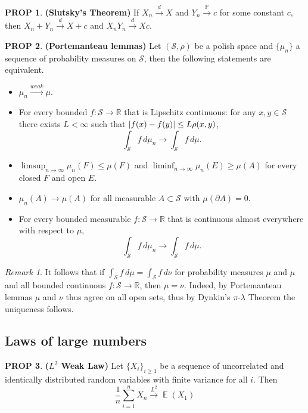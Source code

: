 \documentclass[hidelinks,11pt]{article}
\theoremstyle{definition}
\theoremstyle{dotless}
\newtheorem{prop}{PROP}[section]
\theoremstyle{remark}
\newtheorem*{remark}{Remark}
\DeclareMathOperator{\E}{\mathbb{E}}
\DeclareMathOperator{\1}{\mathbf{1}}
\begin{document}
\begin{prop}\textup{\textbf{(Slutsky's Theorem) }}If $X_n\xrightarrow{d}X$ and $Y_n\xrightarrow{\mathbb{P}}c$ for some constant $c$, then $X_n+Y_n\xrightarrow{d}X+c$ and $X_nY_n\xrightarrow{d}Xc$.
\end{prop}

\begin{prop}\textup{\textbf{(Portemanteau lemmas)}} Let $(\mathcal{S},\rho)$ be a polish space and $\{\mu_n\}$ a sequence of probability measures on $\mathcal{S}$, then the following statements are equivalent.\begin{itemize}
    \item $\mu_n\xrightarrow{weak}\mu$.
    \item For every bounded $f:\mathcal{S}\to\mathbb{R}$ that is Lipschitz continuous: for any $x,y\in\mathcal{S}$ there exists $L<\infty$ such that $\abs{f(x)-f(y)}\leq L\rho(x,y)$,
    \[\int_\mathcal{S}f\,d\mu_n\to\int_\mathcal{S}f\,d\mu.\]
    \item $\limsup_{n\to\infty}\mu_n(F)\leq\mu(F)$ and $\liminf_{n\to\infty}\mu_n(E)\geq\mu(A)$ for every closed $F$ and open $E$.
    \item $\mu_n(A)\to\mu(A)$ for all measurable $A\subset\mathcal{S}$ with $\mu(\partial A)=0$.
    \item For every bounded measurable $f:\mathcal{S}\to\mathbb{R}$ that is continuous almost everywhere with respect to $\mu$,
    \[\int_\mathcal{S}f\,d\mu_n\to\int_\mathcal{S}f\,d\mu.\]
\end{itemize}
\end{prop}

\begin{remark}
It follows that if $\int_\mathcal{S}f\,d\mu=\int_\mathcal{S}f\,d\nu$ for probability measures $\mu$ and $\mu$  and all bounded continuous $f:\mathcal{S}\to\mathbb{R}$, then $\mu=\nu$. Indeed, by Portemanteau lemmas $\mu$ and $\nu$ thus agree on all open sets, thus by Dynkin's $\pi$-$\lambda$ Theorem the uniqueness follows.
\end{remark}

\subsection{Laws of large numbers}

\begin{prop}\textup{\textbf{($L^2$ Weak Law) }}Let $\{X_i\}_{i\geq1}$ be a sequence of uncorrelated and identically distributed random variables with finite variance for all $i$. Then
\[\frac{1}{n}\sum_{i=1}^nX_n\xrightarrow{L^2}\E(X_1)\]
\end{prop}
\end{document}
